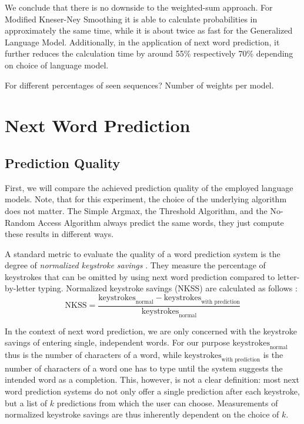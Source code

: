 We conclude that there is no downside to the weighted-sum approach.
For Modified Kneser-Ney Smoothing it is able to calculate probabilities in
approximately the same time, while it is about twice as fast for the
Generalized Language Model.
Additionally, in the application of next word prediction, it further reduces
the calculation time by around 55\% respectively 70\% depending on choice
of language model.

\begin{draft}
For different percentages of seen sequences?
Number of weights per model.
\end{draft}

\section{Next Word Prediction}
\label{sec:evaluation-topkjoin}

\subsection{Prediction Quality}
\label{subsec:evaluation-topkjoin-quality}

First, we will compare the achieved prediction quality of the employed
language models.
Note, that for this experiment, the choice of the underlying algorithm does not
matter.
The Simple Argmax, the Threshold Algorithm, and the No-Random Access Algorithm
always predict the same words, they just compute these results in different
ways.

A standard metric to evaluate the quality of a word prediction system is the
degree of \emph{normalized keystroke savings}
\parencite{Swiffin1987,Bickel2005,Trnka2011}.
They measure the percentage of keystrokes that can be omitted by using next
word prediction compared to letter-by-letter typing.
Normalized keystroke savings (NKSS) are calculated as follows
\parencite{Trnka2011}:
\begin{equation}
  \text{NKSS} = \frac{\text{keystrokes}_\text{normal} - \text{keystrokes}_\text{with prediction}}
                     {\text{keystrokes}_\text{normal}}
\end{equation}

In the context of next word prediction, we are only concerned with the keystroke
savings of entering single, independent words.
For our purpose $\text{keystrokes}_\text{normal}$ thus is the number of
characters of a word, while $\text{keystrokes}_\text{with prediction}$ is
the number of characters of a word one has to type until the system suggests
the intended word as a completion.
This, however, is not a clear definition: most next word prediction systems do
not only offer a single prediction after each keystroke, but a list of $k$
predictions from which the user can choose.
Measurements of normalized keystroke savings are thus inherently dependent on
the choice of $k$.

